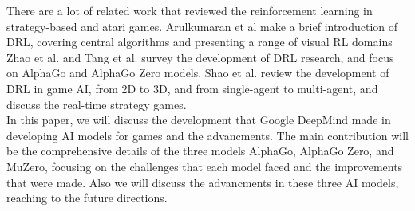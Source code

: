 There are a lot of related work that reviewed the
reinforcement learning in strategy-based and atari games. Arulkumaran et
al\cite{I9} make a brief introduction of DRL, covering central algorithms and
presenting a range of visual RL domains Zhao et al.\cite{I10} and Tang et
al.\cite{I11} survey the development of DRL research, and focus on AlphaGo and
AlphaGo Zero models. Shao et al.\cite{I12} review the development of DRL in
game AI, from 2D to 3D, and from single-agent to multi-agent, and discuss the
real-time strategy games.\\ In this paper, we will discuss the development that
Google DeepMind made in developing AI models for games and the advancments. The
main contribution will be the comprehensive details of the three models
AlphaGo, AlphaGo Zero, and MuZero, focusing on the challenges that each model
faced and the improvements that were made. Also we will discuss the advancments
in these three AI models, reaching to the future directions.